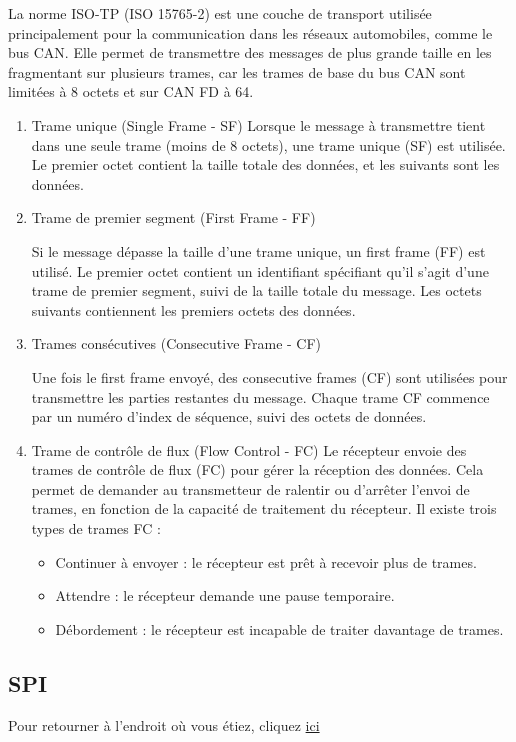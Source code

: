 \documentclass[a4paper, 12pt]{report}
\begin{document}
La norme ISO-TP (ISO 15765-2) \cite{wikipedia_iso_15765_2} est une couche de transport utilisée principalement pour la communication dans les réseaux automobiles, comme le bus CAN. Elle permet de transmettre des messages de plus grande taille en les fragmentant sur plusieurs trames, car les trames de base du bus CAN sont limitées à 8 octets et sur CAN FD à 64.
\begin{enumerate}
    \item Trame unique (Single Frame - SF)
Lorsque le message à transmettre tient dans une seule trame (moins de 8 octets), une trame unique (SF) est utilisée. Le premier octet contient la taille totale des données, et les suivants sont les données.

\item Trame de premier segment (First Frame - FF)

Si le message dépasse la taille d'une trame unique, un first frame (FF) est utilisé. Le premier octet contient un identifiant spécifiant qu'il s'agit d'une trame de premier segment, suivi de la taille totale du message. Les octets suivants contiennent les premiers octets des données.

\item Trames consécutives (Consecutive Frame - CF)

Une fois le first frame envoyé, des consecutive frames (CF) sont utilisées pour transmettre les parties restantes du message. Chaque trame CF commence par un numéro d'index de séquence, suivi des octets de données.

\item Trame de contrôle de flux (Flow Control - FC)
Le récepteur envoie des trames de contrôle de flux (FC) pour gérer la réception des données. Cela permet de demander au transmetteur de ralentir ou d'arrêter l'envoi de trames, en fonction de la capacité de traitement du récepteur. Il existe trois types de trames FC :
\begin{itemize}
    \item Continuer à envoyer : le récepteur est prêt à recevoir plus de trames.
    \item Attendre : le récepteur demande une pause temporaire.
    \item Débordement : le récepteur est incapable de traiter davantage de trames.
\end{itemize}

\end{enumerate}

\subsection{SPI}\label{subsec:spiTP}
Pour retourner à l'endroit où vous étiez, cliquez \hyperref[subsec:analyseL3]{ici}\\
\end{document}
